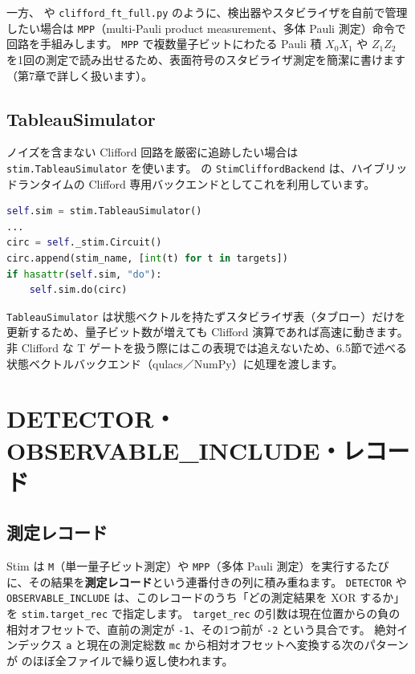 一方、 や \texttt{clifford\_ft\_full.py} のように、検出器やスタビライザを自前で管理したい場合は \texttt{MPP}（multi-Pauli product measurement、多体 Pauli 測定）命令で回路を手組みします。
\texttt{MPP} で複数量子ビットにわたる Pauli 積 $X_0 X_1$ や $Z_1Z_2$ を1回の測定で読み出せるため、表面符号のスタビライザ測定を簡潔に書けます（第7章で詳しく扱います）。

\subsection{TableauSimulator}

ノイズを含まない Clifford 回路を厳密に追跡したい場合は \texttt{stim.TableauSimulator} を使います。
 の \texttt{StimCliffordBackend} は、ハイブリッドランタイムの Clifford 専用バックエンドとしてこれを利用しています。

\begin{lstlisting}[language=Python, caption={src/stages/01\_mpp/src/ftqc/hybrid\_ftqc\_runtime.py の抜粋（StimCliffordBackend）}]
self.sim = stim.TableauSimulator()
...
circ = self._stim.Circuit()
circ.append(stim_name, [int(t) for t in targets])
if hasattr(self.sim, "do"):
    self.sim.do(circ)
\end{lstlisting}

\texttt{TableauSimulator} は状態ベクトルを持たずスタビライザ表（タブロー）だけを更新するため、量子ビット数が増えても Clifford 演算であれば高速に動きます。
非 Clifford な T ゲートを扱う際にはこの表現では追えないため、6.5節で述べる状態ベクトルバックエンド（qulacs／NumPy）に処理を渡します。

\section{DETECTOR・OBSERVABLE\_INCLUDE・レコード}\label{sec:detectors_obs}

\subsection{測定レコード}

Stim は \texttt{M}（単一量子ビット測定）や \texttt{MPP}（多体 Pauli 測定）を実行するたびに、その結果を\textbf{測定レコード}という連番付きの列に積み重ねます。
\texttt{DETECTOR} や \texttt{OBSERVABLE\_INCLUDE} は、このレコードのうち「どの測定結果を XOR するか」を \texttt{stim.target\_rec} で指定します。
\texttt{target\_rec} の引数は現在位置からの負の相対オフセットで、直前の測定が \texttt{-1}、その1つ前が \texttt{-2} という具合です。
絶対インデックス \texttt{a} と現在の測定総数 \texttt{mc} から相対オフセットへ変換する次のパターンが  のほぼ全ファイルで繰り返し使われます。

